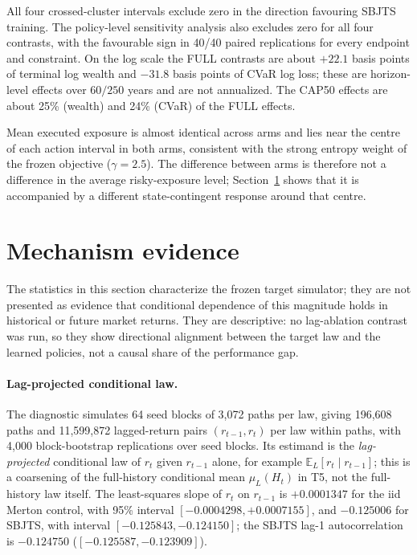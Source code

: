 \documentclass[11pt]{article}
\newcommand{\E}{\mathbb E}
\begin{document}
All four crossed-cluster intervals exclude zero in the direction favouring SBJTS training. The policy-level sensitivity analysis also excludes zero for all four contrasts, with the favourable sign in 40/40 paired replications for every endpoint and constraint. On the log scale the FULL contrasts are about $+22.1$ basis points of terminal log wealth and $-31.8$ basis points of CVaR log loss; these are horizon-level effects over $60/250$ years and are not annualized. The CAP50 effects are about 25\% (wealth) and 24\% (CVaR) of the FULL effects.

Mean executed exposure is almost identical across arms and lies near the centre of each action interval in both arms, consistent with the strong entropy weight of the frozen objective ($\gamma=2.5$). The difference between arms is therefore not a difference in the average risky-exposure level; Section~\ref{sec:mechanism} shows that it is accompanied by a different state-contingent response around that centre.

\section{Mechanism evidence}\label{sec:mechanism}
The statistics in this section characterize the frozen target simulator; they are not presented as evidence that conditional dependence of this magnitude holds in historical or future market returns. They are descriptive: no lag-ablation contrast was run, so they show directional alignment between the target law and the learned policies, not a causal share of the performance gap.

\paragraph{Lag-projected conditional law.} The diagnostic simulates 64 seed blocks of 3,072 paths per law, giving 196,608 paths and 11,599,872 lagged-return pairs $(r_{t-1},r_t)$ per law within paths, with 4,000 block-bootstrap replications over seed blocks. Its estimand is the \emph{lag-projected} conditional law of $r_t$ given $r_{t-1}$ alone, for example $\E_L[r_t\mid r_{t-1}]$; this is a coarsening of the full-history conditional mean $\mu_L(H_t)$ in T5, not the full-history law itself. The least-squares slope of $r_t$ on $r_{t-1}$ is $+0.0001347$ for the iid Merton control, with 95\% interval $[-0.0004298,+0.0007155]$, and $-0.125006$ for SBJTS, with interval $[-0.125843,-0.124150]$; the SBJTS lag-1 autocorrelation is $-0.124750$ ($[-0.125587,-0.123909]$).
\end{document}
